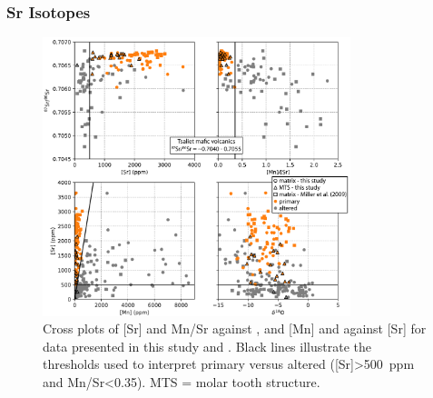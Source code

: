 \subsubsection{Sr Isotopes}

\begin{figure}[h!]
\begin{center}
	\includegraphics[width=0.8\textwidth]{figures/Tambien/Sr-diagenesis.pdf}
	\caption[Cross plots of Sr and Mn.]{Cross plots of [Sr] and Mn/Sr against \SrSr, and [Mn] and \dO against [Sr] for data presented in this study and \citet{Miller2009a}. Black lines illustrate the thresholds used to interpret primary versus altered \SrSr ([Sr]\textgreater500~ppm and Mn/Sr\textless0.35). MTS = molar tooth structure.}
	\label{fig:Sr-diagenesis}
\end{center}
\end{figure}

